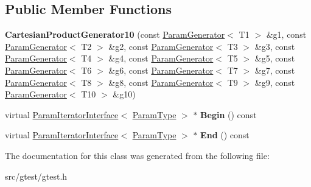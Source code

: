 \subsection*{Public Member Functions}
\begin{DoxyCompactItemize}
\item 
\mbox{\label{classtesting_1_1internal_1_1_cartesian_product_generator10_a53d945670e910c0baaf14f3d25f1bbb6}} 
{\bfseries Cartesian\+Product\+Generator10} (const \mbox{\hyperlink{classtesting_1_1internal_1_1_param_generator}{Param\+Generator}}$<$ T1 $>$ \&g1, const \mbox{\hyperlink{classtesting_1_1internal_1_1_param_generator}{Param\+Generator}}$<$ T2 $>$ \&g2, const \mbox{\hyperlink{classtesting_1_1internal_1_1_param_generator}{Param\+Generator}}$<$ T3 $>$ \&g3, const \mbox{\hyperlink{classtesting_1_1internal_1_1_param_generator}{Param\+Generator}}$<$ T4 $>$ \&g4, const \mbox{\hyperlink{classtesting_1_1internal_1_1_param_generator}{Param\+Generator}}$<$ T5 $>$ \&g5, const \mbox{\hyperlink{classtesting_1_1internal_1_1_param_generator}{Param\+Generator}}$<$ T6 $>$ \&g6, const \mbox{\hyperlink{classtesting_1_1internal_1_1_param_generator}{Param\+Generator}}$<$ T7 $>$ \&g7, const \mbox{\hyperlink{classtesting_1_1internal_1_1_param_generator}{Param\+Generator}}$<$ T8 $>$ \&g8, const \mbox{\hyperlink{classtesting_1_1internal_1_1_param_generator}{Param\+Generator}}$<$ T9 $>$ \&g9, const \mbox{\hyperlink{classtesting_1_1internal_1_1_param_generator}{Param\+Generator}}$<$ T10 $>$ \&g10)
\item 
\mbox{\label{classtesting_1_1internal_1_1_cartesian_product_generator10_a162da48b48e325faf658d87188e23f0b}} 
virtual \mbox{\hyperlink{classtesting_1_1internal_1_1_param_iterator_interface}{Param\+Iterator\+Interface}}$<$ \mbox{\hyperlink{classstd_1_1tr1_1_1tuple}{Param\+Type}} $>$ $\ast$ {\bfseries Begin} () const
\item 
\mbox{\label{classtesting_1_1internal_1_1_cartesian_product_generator10_a7573c282355a6816bc4f0a6693daec1a}} 
virtual \mbox{\hyperlink{classtesting_1_1internal_1_1_param_iterator_interface}{Param\+Iterator\+Interface}}$<$ \mbox{\hyperlink{classstd_1_1tr1_1_1tuple}{Param\+Type}} $>$ $\ast$ {\bfseries End} () const
\end{DoxyCompactItemize}


The documentation for this class was generated from the following file\+:\begin{DoxyCompactItemize}
\item 
src/gtest/gtest.\+h\end{DoxyCompactItemize}

